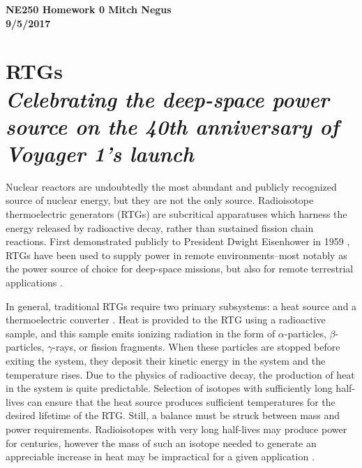 \documentclass{article}
\newcommand{\tab}{\-\hspace{1cm}}
\begin{document}
\thispagestyle{empty}

{\bf {\large {NE250 Homework {0} \hfill Mitch Negus\\
		\hspace*{\fill} 9/5/2017\\ }}}
\section*{RTGs\\\textit{\normalsize Celebrating the deep-space power source on the 40th anniversary of Voyager 1's launch}}

\begin{multicols}{2}

\tab Nuclear reactors are undoubtedly the most abundant and publicly recognized source of nuclear energy, but they are not the only source. Radioisotope thermoelectric generators (RTGs) are subcritical apparatuses which harness the energy released by radioactive decay, rather than sustained fission chain reactions. First demonstrated publicly to President Dwight Eisenhower in 1959 \cite{rowe}, RTGs have been used to supply power in remote environments--most notably as the power source of choice for deep-space missions, but also for remote terrestrial applications \cite{lange}. 

\tab In general, traditional RTGs require two primary subsystems: a heat source and a thermoelectric converter \cite{rowe,lange}. Heat is provided to the RTG using a radioactive sample, and this sample emits ionizing radiation in the form of $\alpha$-particles, $\beta$-particles, $\gamma$-rays, or fission fragments. When these particles are stopped before exiting the system, they deposit their kinetic energy in the system and the temperature rises. Due to the physics of radioactive decay, the production of heat in the system is quite predictable. Selection of isotopes with sufficiently long half-lives can ensure that the heat source produces sufficient temperatures for the desired lifetime of the RTG. Still, a balance must be struck between mass and power requirements. Radioisotopes with very long half-lives may produce power for centuries, however the mass of such an isotope needed to generate an appreciable increase in heat may be impractical for a given application \cite{lange}.


\end{multicols}
\end{document}
